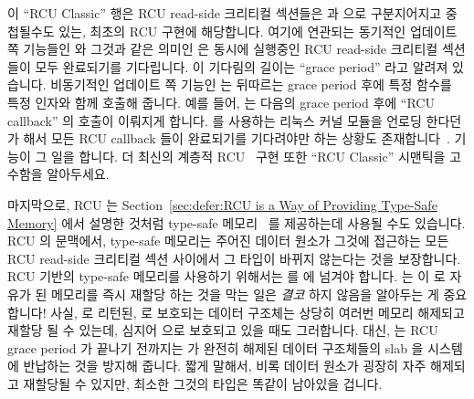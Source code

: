 이 ``RCU Classic'' 행은 RCU read-side 크리티컬 섹션들은  과
 으로 구분지어지고 중첩될수도 있는, 최초의 RCU 구현에
해당합니다.
여기에 연관되는 동기적인 업데이트 쪽 기능들인  와 그것과
같은 의미인  은 동시에 실행중인 RCU read-side 크리티컬
섹션들이 모두 완료되기를 기다립니다.
이 기다림의 길이는 ``grace period'' 라고 알려져 있습니다.
비동기적인 업데이트 쪽 기능인  는 뒤따르는 grace period 후에
특정 함수를 특정 인자와 함께 호출해 줍니다.
예를 들어,  는 다음의 grace period 후에 ``RCU callback''
 의 호출이 이뤄지게 합니다.
 를 사용하는 리눅스 커널 모듈을 언로딩 한다던가 해서 모든 RCU
callback 들이 완료되기를 기다려야만 하는 상황도
존재합니다~\cite{PaulEMcKenney2007rcubarrier}.
 기능이 그 일을 합니다.
더 최신의 계층적 RCU~\cite{PaulEMcKenney2008HierarchicalRCU} 구현 또한 ``RCU
Classic'' 시맨틱을 고수함을 알아두세요.
\iffalse

The ``RCU Classic'' column corresponds to the original RCU implementation,
in which RCU read-side critical sections are delimited by
\co{rcu_read_lock()} and \co{rcu_read_unlock()}, which
may be nested.
The corresponding synchronous update-side primitives,
\co{synchronize_rcu()}, along with its synonym
\co{synchronize_net()}, wait for any currently executing
RCU read-side critical sections to complete.
The length of this wait is known as a ``grace period''.
The asynchronous update-side primitive, \co{call_rcu()},
invokes a specified function with a specified argument after a
subsequent grace period.
For example, \co{call_rcu(p,f);} will result in
the ``RCU callback'' \co{f(p)}
being invoked after a subsequent grace period.
There are situations,
such as when unloading a Linux-kernel module that uses \co{call_rcu()},
when it is necessary to wait for all
outstanding RCU callbacks to complete~\cite{PaulEMcKenney2007rcubarrier}.
The \co{rcu_barrier()} primitive does this job.
Note that the more recent hierarchical
RCU~\cite{PaulEMcKenney2008HierarchicalRCU}
implementation also adheres to ``RCU Classic'' semantics.
\fi

마지막으로, RCU 는
Section~\ref{sec:defer:RCU is a Way of Providing Type-Safe Memory} 에서 설명한
것처럼 type-safe 메모리~\cite{Cheriton96a} 를 제공하는데 사용될 수도 있습니다.
RCU 의 문맥에서, type-safe 메모리는 주어진 데이터 원소가 그것에 접근하는 모든
RCU read-side 크리티컬 섹션 사이에서 그 타입이 바뀌지 않는다는 것을 보장합니다.
RCU 기반의 type-safe 메모리를 사용하기 위해서는  를
 에 넘겨야 합니다.
 는  이 
로 자유가 된 메모리를 즉시 재할당 하는 것을 막는 일은 \emph{결코} 하지 않음을
알아두는 게 중요합니다!
사실,  로 리턴된,  로 보호되는 데이터
구조체는 상당히 여러번 메모리 해제되고 재할당 될 수 있는데, 심지어
 으로 보호되고 있을 때도 그러합니다.
대신,  는 RCU grace period 가 끝나기 전까지는
 가 완전히 해제된 데이터 구조체들의 slab 을 시스템에
반납하는 것을 방지해 줍니다.
짧게 말해서, 비록 데이터 원소가 굉장히 자주 해제되고 재할당될 수 있지만, 최소한
그것의 타입은 똑같이 남아있을 겁니다.
\iffalse

